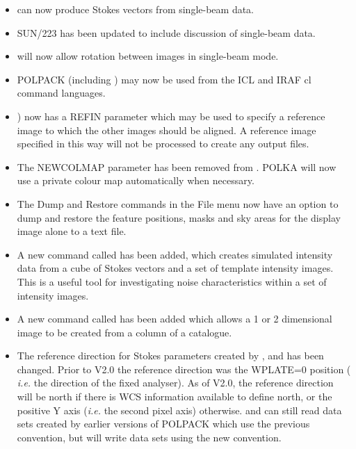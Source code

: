 \documentclass[twoside,11pt]{starlink}
\begin{document}
\begin{itemize}

\item {} can now produce Stokes vectors from
single-beam data.

\item SUN/223 has been updated to include discussion of single-beam data.

\item {} will now allow rotation between images in
single-beam mode.

\item POLPACK (including ) may now be used from the
ICL and IRAF cl command languages.

\item {}) now has a REFIN parameter which may be used
to specify a reference image to which the other images should be aligned.
A reference image specified in this way will not be processed to create
any output files.

\item The NEWCOLMAP parameter has been removed from .
POLKA will now use a private colour map automatically when necessary.

\item The Dump and Restore commands in the  File menu
now have an option to dump and restore the feature positions, masks and sky
areas for the display image alone to a text file.

\item A new command called  has been added, which
creates simulated intensity data from a cube of Stokes vectors and a set
of template intensity images. This is a useful tool for investigating
noise characteristics within a set of intensity images.

\item A new command called  has been added
which allows a 1 or 2 dimensional image to be created from a column of a
catalogue.

\item The reference direction for Stokes parameters created by
,  and
 has been changed.
Prior to V2.0 the reference direction was the WPLATE=0 position (\emph{
i.e.} the direction of the fixed analyser). As of V2.0, the reference
direction will be north if there is WCS information available to define
north, or the positive Y axis (\emph{i.e.} the second pixel axis)
otherwise.  and  can still read data sets
created by earlier versions of POLPACK which use the previous convention, but will
write data sets using the new convention.


\end{itemize}
\end{document}
